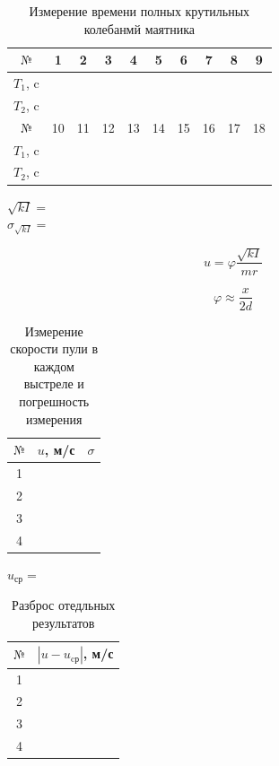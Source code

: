 \documentclass[a4paper,12pt]{article} %
\begin{document}
\begin{table}[h!]
\renewcommand{\tabcolsep}{3mm}
\centering
\caption{Измерение времени полных крутильных колебанмй маятника}
\label{table 4}
\begin{tabular}{|c|c|c|c|c|c|c|c|c|c|}
\hline
$\text{№}$ & 1 & 2 & 3 & 4 & 5 & 6  & 7 & 8 & 9\\ \hline
$T_1$, c&   &   &   &   &   &  &	&	& \\ \hline
$T_2$, c   &   &   &   &   &   &  &	&	&  \\ \hline \hline
$\text{№}$ & 10 & 11 & 12 & 13 & 14 & 15  & 16 & 17 & 18\\ \hline
$T_1$, c &    &   &   &   &   &  &	&	& \\ \hline
$T_2$, c   &   &   &   &   &   &  &	&	&  \\ \hline
\end{tabular}
\end{table}
$\sqrt{kI} = $
\\

$\sigma_{\sqrt{kI}}=$


\[u = \varphi\frac{\sqrt{kI}}{mr}\]

\[\varphi\approx\frac{x}{2d}\]


\begin{table}[h]
\centering
\caption{Измерение скорости пули в каждом выстреле и погрешность измерения}
\begin{tabular}{|c|p{2cm}|p{2cm}|}
\hline
$\text{№}$ & $u$, м/с & $\sigma$ \\ \hline
1 & &\\ \hline
2 & &\\ \hline
3& &\\ \hline
4 & &\\ \hline
\end{tabular}
\end{table}
$u_\text{ср}=$
\newpage
\begin{table}[h]
\centering
\caption{Разброс отедльных результатов}
\begin{tabular}{|c|p{3cm}|}
\hline
$\text{№}$ & $|u-u_\text{cр}|$, м/с  \\ \hline
1 & \\ \hline
2 & \\ \hline
3& \\ \hline
4 & \\ \hline
\end{tabular}
\end{table}
\end{document}
